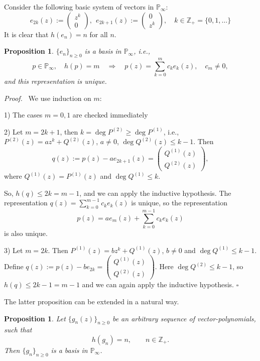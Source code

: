 \documentclass{amsart}
\newtheorem{proposition}[theorem]{Proposition}
\begin{document}
Consider the following basic system of vectors in
$\mathbb{P}_\infty$:
 \begin{equation} \label{2.62}
e_{2k}(z):=
\begin{pmatrix} z^k\\ 0\end{pmatrix}, \ \
e_{2k+1}(z):= \begin{pmatrix} 0\\ z^k
\end{pmatrix}, \quad k\in{{\mathbb Z}}_+=\{0,1,\ldots\}
\end{equation}
It is clear that $h(e_n)=n$ for all $n$.

\begin{proposition} \label{propos2.2}
{\it $\{e_n\}_{n\ge0}$ is a basis in ${{\mathbb P}}_\infty$, i.e.,
$$ p\in {{\mathbb P}}_\infty, \quad h(p)=m \quad \Longrightarrow \quad
p(z)=\sum_{k=0}^mc_ke_k(z), \quad c_m\ne0,
$$
and this representation is unique.}
\end{proposition}

{\it Proof.} \ We use induction on $m$:

1) The cases $m=0,1$ are checked immediately

2) Let $m=2k+1$, then $k=\deg P^{(2)}\ge \deg P^{(1)}$, i.e.,
$P^{(2)}(z)=a z^k + Q^{(2)}(z)$, $a\ne0$, $\deg Q^{(2)}(z)\leq k-1$.
Then
$$ q(z):= p(z) - a e_{2k+1}(z)=
\begin{pmatrix} Q^{(1)}(z)\\ Q^{(2)}(z)
\end{pmatrix},
$$
where $Q^{(1)}(z)=P^{(1)}(z)$ and $\deg Q^{(1)}\leq k$.

So, $h(q)\leq 2k = m-1$, and we can apply the inductive hypothesis.
The representation $q(z)=\sum_{k=0}^{m-1}c_ke_k(z)$ is unique, so
the representation
$$ p(z)=a e_m(z) + \sum_{k=0}^{m-1}c_ke_k(z)
$$
is also unique.

3) Let $m=2k$. Then $P^{(1)}(z)=bz^k + Q^{(1)}(z)$, $b\ne 0$ and
$\deg Q^{(1)}\leq k-1$. Define $q(z):=p(z)-be_{2k}=
\begin{pmatrix} Q^{(1)}(z)\\ Q^{(2)}(z)
\end{pmatrix}$.
Here $\deg Q^{(2)}\leq k-1$, so $h(q)\leq 2k-1=m-1$ and we can again
apply the inductive hypothesis. \hfill $\square$

\medskip

The latter proposition can be extended in a natural way.

\begin{proposition} \label{propos2.3}
{\it Let $\{g_n(z)\}_{n\ge0}$ be an arbitrary sequence of
vector-polynomials, such that
$$ h(g_n) = n, \qquad  n\in{{\mathbb Z}}_+.  $$
Then $\{g_n\}_{n\ge 0}$ is a basis in ${{\mathbb P}}_\infty$. }
\end{proposition}
\end{document}
